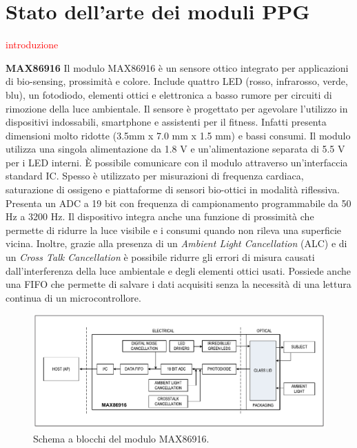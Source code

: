 \section{Stato dell'arte dei moduli PPG}
\textcolor{red}{introduzione}

\textbf{MAX86916} Il modulo MAX86916 è un sensore ottico integrato per applicazioni di bio-sensing, prossimità e colore\cite{IntegratedMAX86916}. Include quattro LED (rosso, infrarosso, verde, blu), un fotodiodo, elementi ottici e elettronica a basso rumore per circuiti di rimozione della luce ambientale. Il sensore è progettato per agevolare l'utilizzo in dispositivi indossabili, smartphone e assistenti per il fitness. Infatti presenta dimensioni molto ridotte (3.5mm x 7.0 mm x 1.5 mm) e bassi consumi. Il modulo utilizza una singola alimentazione da 1.8 V e un'alimentazione separata di 5.5 V per i LED interni. \`E possibile comunicare con il modulo attraverso un'interfaccia standard IC. Spesso è utilizzato per misurazioni di frequenza cardiaca, saturazione di ossigeno e piattaforme di sensori bio-ottici in modalità riflessiva. Presenta un ADC a 19 bit con frequenza di campionamento programmabile da 50 Hz a 3200 Hz. Il dispositivo integra anche una funzione di prossimità che permette di ridurre la luce visibile e i consumi quando non rileva una superficie vicina. Inoltre, grazie alla presenza di un \textit{Ambient Light Cancellation} (ALC) e di un \textit{Cross Talk Cancellation} è possibile ridurre gli errori di misura causati dall'interferenza della luce ambientale e degli elementi ottici usati. Possiede anche una FIFO che permette di salvare i dati acquisiti senza la necessità di una lettura continua di un microcontrollore.
\begin{figure}[h]
	\centering
	\includegraphics[width=1\linewidth]{ImageFiles/Fotopletismografia/MAX86916BlockDiagram}
	\caption{Schema a blocchi del modulo MAX86916.}
	\label{fig:MAX86916BlockDiagram}
\end{figure}

